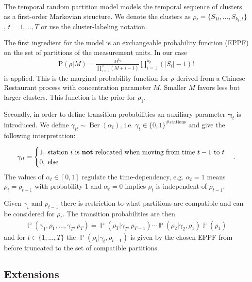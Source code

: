 \documentclass[12pt,a4paper]{article}
\DeclareMathOperator{\Bernoulli}{\mathrm{Ber}}
\DeclareMathOperator{\PP}{\mathbb{P}}
\begin{document}
The temporal random partition model models the temporal sequence of clusters as a first-order Markovian structure. We denote the clusters as $\rho_t = \{S_{1t}, \ldots, S_{k_t, t}\}$, $t=1, \ldots, T$ or use the cluster-labeling notation. 

The first ingredient for the model is an exchangeable probability function (EPPF) on the set of partitions of the measurement units. In our case
\begin{align*}
    \text{P} (\rho\vert M) = \frac{M^{k_\rho}}{\prod_{i=1}^n (M+i-1)} \prod_{i=1}^{k_\rho} \left( \vert S_i\vert -1\right)!
\end{align*}
is applied. This is the marginal probability function for $\rho$ derived from a Chinese Restaurant process with concentration parameter $M$. Smaller $M$ favors less but larger clusters. This function is the prior for $\rho_1$.
 
Secondly, in order to define transition probabilities an auxiliary parameter $\mathbf{\gamma}_t$ is introduced. We define $\gamma_{it} \sim \Bernoulli(\alpha_t)$, i.e. 
$\gamma_t \in \{0,1\}^{\#\text{stations}}$ and give the following interpretation:

\begin{align*}
    \gamma_{it} = \begin{cases}
        1, \; \text{station } i \text{ is \textbf{not} relocated when moving from time } t-1 \text{ to } t\\
        0, \; \text{else}
    \end{cases}.
\end{align*}
The values of $\alpha_t \in [0,1]$ regulate the time-dependency, e.g. $\alpha_t = 1$ means $\rho_t = \rho_{t-1}$ with probability 1 and $\alpha_t = 0$ implies $\rho_t$ is independent of $\rho_{t-1}$. \medskip

Given $\gamma_t$ and $\rho_{t-1}$ there is restriction to what partitions are compatible and can be considered for $\rho_{t}$. The transition probabilities are then
\begin{align*}
    \PP(\gamma_1, \rho_1, \ldots, \gamma_T, \rho_T) = \PP(\rho_T\vert \gamma_T, \rho_{T-1})  \cdots  \PP(\rho_2\vert \gamma_2, \rho_{1}) \PP(\rho_1)
\end{align*}
and for $t \in \{1, \dots, T \}$ the $\PP(\rho_t\vert \gamma_t, \rho_{t-1})$ is given by the chosen EPPF from before truncated to the set of compatible partitions.

\subsection{Extensions}
\label{subsec:DRPMExtensions}
\end{document}
